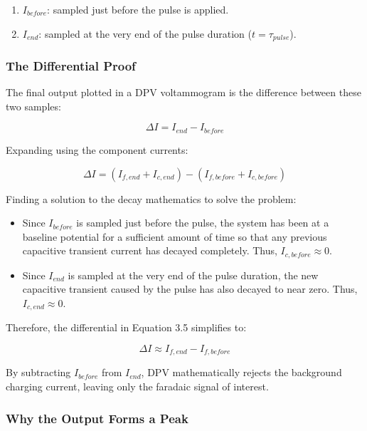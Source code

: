 \begin{enumerate}
    \item $I_{before}$: sampled just before the pulse is applied.
    \item $I_{end}$: sampled at the very end of the pulse duration ($t = \tau_{pulse}$).
\end{enumerate}

\subsubsection{The Differential Proof}

The final output plotted in a DPV voltammogram is the difference between these two samples:

\begin{equation}
\Delta I = I_{end} - I_{before}
\end{equation}

Expanding using the component currents:

\begin{equation}
\Delta I = \left(I_{f,end} + I_{c,end}\right) - \left(I_{f,before} + I_{c,before}\right)
\end{equation}

Finding a solution to the decay mathematics to solve the problem:

\begin{itemize}[label=\textbullet]
    \item Since $I_{before}$ is sampled just before the pulse, the system has been at a baseline potential for a sufficient amount of time so that any previous capacitive transient current has decayed completely. Thus, $I_{c,before} \approx 0$.
    \item Since $I_{end}$ is sampled at the very end of the pulse duration, the new capacitive transient caused by the pulse has also decayed to near zero. Thus, $I_{c,end} \approx 0$.

\end{itemize}

Therefore, the differential in Equation 3.5 simplifies to:

\begin{equation}
\Delta I \approx I_{f,end} - I_{f,before}
\end{equation}

By subtracting $I_{before}$ from $I_{end}$, DPV mathematically rejects the background charging current, leaving only the faradaic signal of interest.

\subsubsection{Why the Output Forms a Peak}

